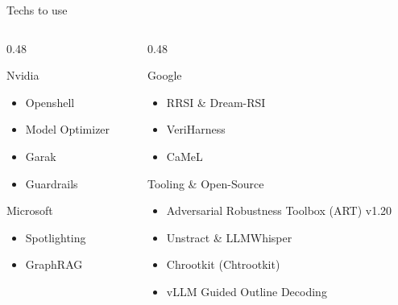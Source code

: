 \documentclass[aspectratio=169, 11pt]{beamer}
\begin{document}
\begin{frame}{Techs to use}
    \scriptsize
    \begin{columns}[t, onlytextwidth]
        \begin{column}{0.48\textwidth}
            \begin{icard}[AccentTeal]{Nvidia}
                \begin{itemize}
                    \setlength\itemsep{0.15em}
                    \item Openshell
                    \item Model Optimizer
                    \item Garak
                    \item Guardrails
                \end{itemize}
            \end{icard}
            \vspace{0.15cm}
            \begin{icard}[AccentBlue]{Microsoft}
                \begin{itemize}
                    \setlength\itemsep{0.15em}
                    \item Spotlighting
                    \item GraphRAG
                \end{itemize}
            \end{icard}
        \end{column}
        \begin{column}{0.48\textwidth}
            \begin{icard}[AccentIndigo]{Google}
                \begin{itemize}
                    \setlength\itemsep{0.15em}
                    \item RRSI \& Dream-RSI
                    \item VeriHarness
                    \item CaMeL
                \end{itemize}
            \end{icard}
            \vspace{0.15cm}
            \begin{icard}[AccentAmber]{Tooling \& Open-Source}
                \begin{itemize}
                    \setlength\itemsep{0.15em}
                    \item Adversarial Robustness Toolbox (ART) v1.20
                    \item Unstract \& LLMWhisper
                    \item Chrootkit (Chtrootkit)
                    \item vLLM Guided Outline Decoding
                \end{itemize}
            \end{icard}
        \end{column}
    \end{columns}
\end{frame}
\end{document}
